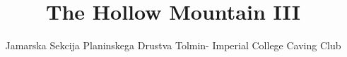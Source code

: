 \documentclass[symmetric, a4paper]{tufte-book}
\title{The Hollow Mountain III}
\author{Jamarska Sekcija Planinskega Drustva Tolmin- Imperial College Caving Club}
\begin{document}
\maketitle %

\justify

\tableofcontents %

\newpage




	

	
  	
	
 	
	
	
	

	
	
    \printindex
    \printindex[aut]

   
    
	\label{Bibliography}
	
	
	

	
\end{document}
